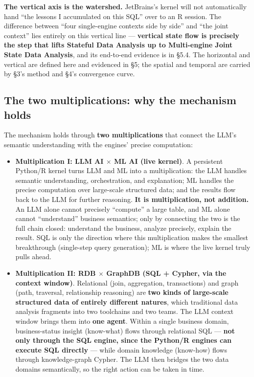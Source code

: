 \documentclass[11pt]{article}
\begin{document}
\textbf{The vertical axis is the watershed.} JetBrains's kernel will not automatically hand ``the lessons I accumulated on this SQL'' over to an R session. The difference between ``four single-engine contexts side by side'' and ``the joint context'' lies entirely on this vertical line --- \textbf{vertical state flow is precisely the step that lifts Stateful Data Analysis up to Multi-engine Joint State Data Analysis}, and its end-to-end evidence is in \S{}5.4. The horizontal and vertical are defined here and evidenced in \S{}5; the spatial and temporal are carried by \S{}3's method and \S{}4's convergence curve.

\subsection{The two multiplications: why the mechanism holds}

The mechanism holds through \textbf{two multiplications} that connect the LLM's semantic understanding with the engines' precise computation:

\begin{itemize}
\item
  \textbf{Multiplication I: LLM AI $\times$ ML AI (live kernel)}. A persistent Python/R kernel turns LLM and ML into a multiplication: the LLM handles semantic understanding, orchestration, and explanation; ML handles the precise computation over large-scale structured data; and the results flow back to the LLM for further reasoning. \textbf{It is multiplication, not addition.} An LLM alone cannot precisely ``compute'' a large table, and ML alone cannot ``understand'' business semantics; only by connecting the two is the full chain closed: understand the business, analyze precisely, explain the result. SQL is only the direction where this multiplication makes the smallest breakthrough (single-step query generation); ML is where the live kernel truly pulls ahead.
\item
  \textbf{Multiplication II: RDB $\times$ GraphDB (SQL + Cypher, via the context window)}. Relational (join, aggregation, transactions) and graph (path, traversal, relationship reasoning) are \textbf{two kinds of large-scale structured data of entirely different natures}, which traditional data analysis fragments into two toolchains and two teams. The LLM context window brings them into \textbf{one agent}. Within a single business domain, business-status insight (know-what) flows through relational SQL --- \textbf{not only through the SQL engine, since the Python/R engines can execute SQL directly} --- while domain knowledge (know-how) flows through knowledge-graph Cypher. The LLM then bridges the two data domains semantically, so the right action can be taken in time.
\end{itemize}
\end{document}
